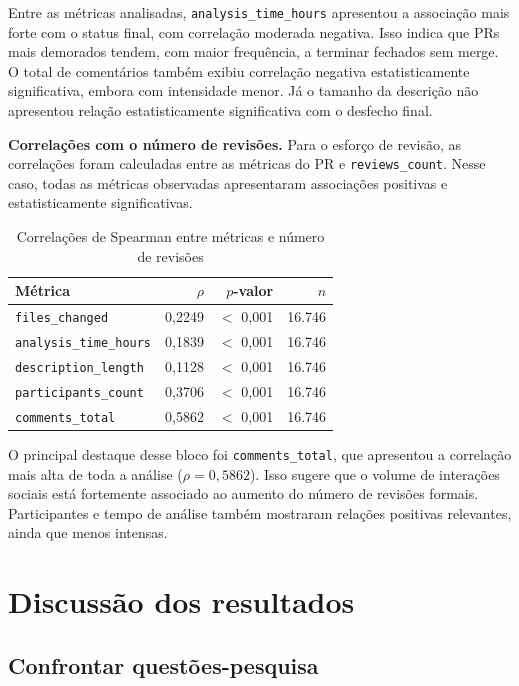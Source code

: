 \documentclass[12pt,a4paper]{article}
\begin{document}
Entre as m\'etricas analisadas, \texttt{analysis\_time\_hours} apresentou a associa\c{c}\~ao mais forte com o status final, com correla\c{c}\~ao moderada negativa. Isso indica que PRs mais demorados tendem, com maior frequ\^encia, a terminar fechados sem merge. O total de coment\'arios tamb\'em exibiu correla\c{c}\~ao negativa estatisticamente significativa, embora com intensidade menor. J\'a o tamanho da descri\c{c}\~ao n\~ao apresentou rela\c{c}\~ao estatisticamente significativa com o desfecho final.

\textbf{Correla\c{c}\~oes com o n\'umero de revis\~oes.} Para o esfor\c{c}o de revis\~ao, as correla\c{c}\~oes foram calculadas entre as m\'etricas do PR e \texttt{reviews\_count}. Nesse caso, todas as m\'etricas observadas apresentaram associa\c{c}\~oes positivas e estatisticamente significativas.

\begin{table}[H]
\centering
\caption{Correla\c{c}\~oes de Spearman entre m\'etricas e n\'umero de revis\~oes}
\begin{tabular}{@{}lrrr@{}}
\toprule
M\'etrica & $\rho$ & $p$-valor & $n$ \\ \midrule
\texttt{files\_changed} & 0,2249 & $<$ 0,001 & 16.746 \\
\texttt{analysis\_time\_hours} & 0,1839 & $<$ 0,001 & 16.746 \\
\texttt{description\_length} & 0,1128 & $<$ 0,001 & 16.746 \\
\texttt{participants\_count} & 0,3706 & $<$ 0,001 & 16.746 \\
\texttt{comments\_total} & 0,5862 & $<$ 0,001 & 16.746 \\ \bottomrule
\end{tabular}
\end{table}

O principal destaque desse bloco foi \texttt{comments\_total}, que apresentou a correla\c{c}\~ao mais alta de toda a an\'alise ($\rho = 0{,}5862$). Isso sugere que o volume de intera\c{c}\~oes sociais est\'a fortemente associado ao aumento do n\'umero de revis\~oes formais. Participantes e tempo de an\'alise tamb\'em mostraram rela\c{c}\~oes positivas relevantes, ainda que menos intensas.


\section{Discuss\~ao dos resultados}

\subsection{Confrontar quest\~oes-pesquisa}
\end{document}
